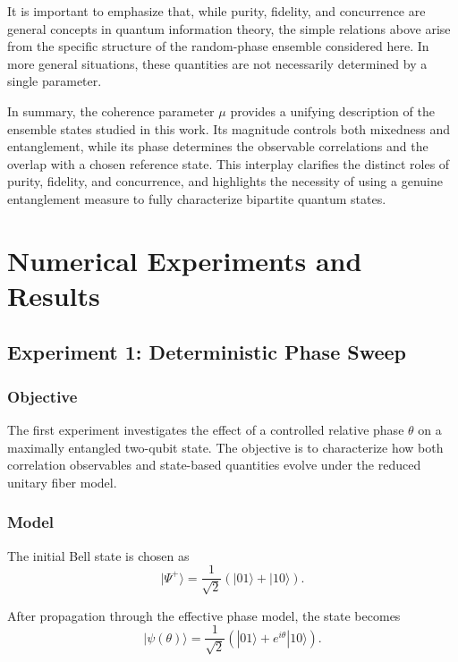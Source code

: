\documentclass[a4paper]{article}
\begin{document}
It is important to emphasize that, while purity, fidelity, and concurrence are general concepts in quantum information theory, the simple relations above arise from the specific structure of the random-phase ensemble considered here. In more general situations, these quantities are not necessarily determined by a single parameter.

\medskip

In summary, the coherence parameter \(\mu\) provides a unifying description of the ensemble states studied in this work. Its magnitude controls both mixedness and entanglement, while its phase determines the observable correlations and the overlap with a chosen reference state. This interplay clarifies the distinct roles of purity, fidelity, and concurrence, and highlights the necessity of using a genuine entanglement measure to fully characterize bipartite quantum states.

\section{Numerical Experiments and Results}

\subsection{Experiment 1: Deterministic Phase Sweep}

\subsubsection{Objective}

The first experiment investigates the effect of a controlled relative phase \(\theta\) on a maximally entangled two-qubit state. The objective is to characterize how both correlation observables and state-based quantities evolve under the reduced unitary fiber model.

\subsubsection{Model}

The initial Bell state is chosen as
\[
|\Psi^{+}\rangle
=
\frac{1}{\sqrt{2}}
\left(
|01\rangle + |10\rangle
\right).
\]

After propagation through the effective phase model, the state becomes
\[
|\psi(\theta)\rangle
=
\frac{1}{\sqrt{2}}
\left(
|01\rangle + e^{i\theta}|10\rangle
\right).
\]
\end{document}
